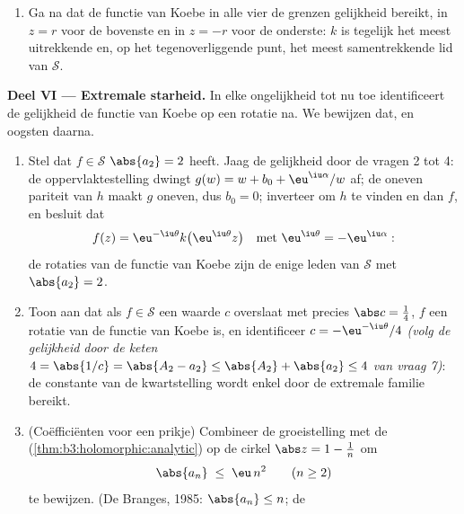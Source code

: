 \begin{problem}
\begin{enumerate}[resume]
{        lijnstuk $[0, f(z)]$ volgens vraag 7 in $f(\mathbb D)$;
        trek het terug met $f^{-1}$ ---  volgens
        \cref{cor:b3:residues:openmapping} --- en schat
        $\abs{f(z)} = \int_\gamma\abs{f'(\zeta)}
        \,\abs{\dd\zeta} \geq \int_0^r\frac{1 - t}{(1 +
        t)^3}\,\dd t$ af, met $\abs{\dd\zeta} \geq
        \dd\abs\zeta$)}.
  \item Ga na dat de functie van Koebe in alle vier de grenzen
        gelijkheid bereikt, in $z = r$ voor de bovenste en in $z
        = -r$ voor de onderste: $k$ is tegelijk het meest
        uitrekkende en, op het tegenoverliggende punt, het meest
        samentrekkende lid van $\mathcal S$.
\end{enumerate}

\medskip
\noindent\textbf{Deel VI --- Extremale starheid.} In elke
ongelijkheid tot nu toe identificeert de gelijkheid de functie
van Koebe op een rotatie na. We bewijzen dat, en oogsten daarna.
\begin{enumerate}[resume]
  \item Stel dat $f \in \mathcal S$ $\abs{a_2} = 2$ heeft. Jaag
        de gelijkheid door de vragen 2 tot 4: de
        oppervlaktestelling dwingt $g(w) = w + b_0 +
        \eu^{\iu\alpha}/w$ af; de oneven pariteit van $h$ maakt
        $g$ oneven, dus $b_0 = 0$; inverteer om $h$ te vinden en
        dan $f$, en besluit dat
        \[
        f(z) = \eu^{-\iu\theta}k\bigl(\eu^{\iu\theta}z\bigr)
        \quad\text{met } \eu^{\iu\theta} =
        -\eu^{\iu\alpha} :
        \]
        de rotaties van de functie van Koebe zijn de enige leden
        van $\mathcal S$ met $\abs{a_2} = 2$.
  \item Toon aan dat als $f \in \mathcal S$ een waarde $c$
        overslaat met precies $\abs c = \frac14$, $f$ een rotatie
        van de functie van Koebe is, en identificeer $c =
        -\eu^{-\iu\theta}/4$ \emph{(volg de gelijkheid door de
        keten $4 = \abs{1/c} = \abs{A_2 - a_2} \leq \abs{A_2} +
        \abs{a_2} \leq 4$ van vraag 7)}: de constante van de
        kwartstelling wordt enkel door de extremale familie
        bereikt.
  \item (Coëfficiënten voor een prikje) Combineer de groeistelling
        met de 
        (\cref{thm:b3:holomorphic:analytic}) op de cirkel $\abs z
        = 1 - \frac1n$ om
        \[
        \abs{a_n} \;\leq\; \eu\,n^2 \qquad (n \geq 2)
        \]
        te bewijzen. (De Branges, 1985: $\abs{a_n} \leq n$; de

\end{enumerate}
\end{problem}
